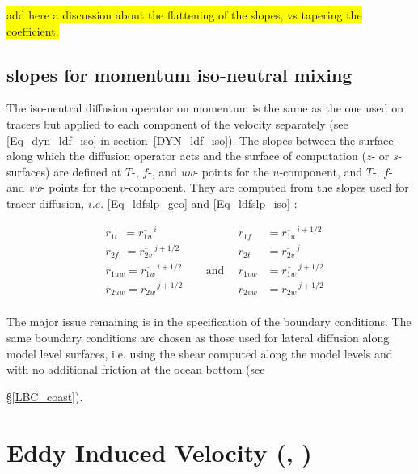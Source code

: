 {\colorbox{yellow}{add here a discussion about the flattening of the slopes, vs  tapering the coefficient.}

\subsection{slopes for momentum iso-neutral mixing}

The iso-neutral diffusion operator on momentum is the same as the one used on 
tracers but applied to each component of the velocity separately (see 
\eqref{Eq_dyn_ldf_iso} in section~\ref{DYN_ldf_iso}). The slopes between the 
surface along which the diffusion operator acts and the surface of computation 
($z$- or $s$-surfaces) are defined at $T$-, $f$-, and \textit{uw}- points for the 
$u$-component, and $T$-, $f$- and \textit{vw}- points for the $v$-component. 
They are computed from the slopes used for tracer diffusion, $i.e.$ 
\eqref{Eq_ldfslp_geo} and \eqref{Eq_ldfslp_iso} :

\begin{equation} \label{Eq_ldfslp_dyn}
\begin{aligned}
&r_{1t}\ \ = \overline{r_{1u}}^{\,i}       &&&    r_{1f}\ \ &= \overline{r_{1u}}^{\,i+1/2} \\
&r_{2f} \ \ = \overline{r_{2v}}^{\,j+1/2} &&& 	r_{2t}\ &= \overline{r_{2v}}^{\,j} \\
&r_{1uw}  = \overline{r_{1w}}^{\,i+1/2} &&\ \ \text{and} \ \ &   r_{1vw}&= \overline{r_{1w}}^{\,j+1/2} \\
&r_{2uw}= \overline{r_{2w}}^{\,j+1/2} &&&         r_{2vw}&= \overline{r_{2w}}^{\,j+1/2}\\
\end{aligned}
\end{equation}

The major issue remaining is in the specification of the boundary conditions. 
The same boundary conditions are chosen as those used for lateral 
diffusion along model level surfaces, i.e. using the shear computed along 
the model levels and with no additional friction at the ocean bottom (see 
{\S\ref{LBC_coast}).


\section  [Eddy Induced Velocity (\textit{traadv\_eiv}, \textit{ldfeiv})]
		{Eddy Induced Velocity (, )}
\label{LDF_eiv}

}}
